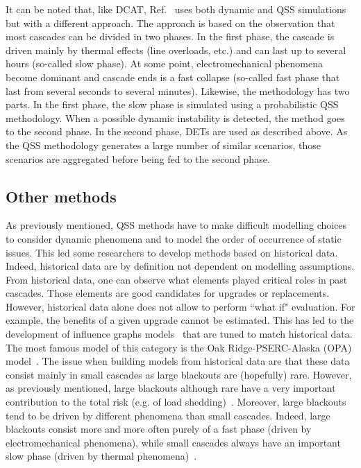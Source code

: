It can be noted that, like DCAT, Ref.~\cite{PierreIEEEtran} uses both dynamic and QSS simulations but with a different approach. The approach is based on the observation that most cascades can be divided in two phases. In the first phase, the cascade is driven mainly by thermal effects (line overloads, etc.) and can last up to several hours (so-called slow phase). At some point, electromechanical phenomena become dominant and cascade ends is a fast collapse (so-called fast phase that last from several seconds to several minutes). Likewise, the methodology has two parts. In the first phase, the slow phase is simulated using a probabilistic QSS methodology. When a possible dynamic instability is detected, the method goes to the second phase. In the second phase, DETs are used as described above. As the QSS methodology generates a large number of similar scenarios, those scenarios are aggregated before being fed to the second phase.



\subsection{Other methods}
\label{sec:OtherMethods}

As previously mentioned, QSS methods have to make difficult modelling choices to consider dynamic phenomena and to model the order of occurrence of static issues. This led some researchers to develop methods based on historical data. Indeed, historical data are by definition not dependent on modelling assumptions. From historical data, one can observe what elements played critical roles in past cascades. Those elements are good candidates for upgrades or replacements. However, historical data alone does not allow to perform ``what if" evaluation. For example, the benefits of a given upgrade cannot be estimated. This has led to the development of influence graphs models~\cite{CascadingInfluenceGraph} that are tuned to match historical data. The most famous model of this category is the Oak Ridge-PSERC-Alaska (OPA) model~\cite{OPA2019}. The issue when building models from historical data are that these data consist mainly in small cascades as large blackouts are (hopefully) rare. However, as previously mentioned, large blackouts although rare have a very important contribution to the total risk (e.g. of load shedding)~\cite{CascadingMethodoAndChallenges}. Moreover, large blackouts tend to be driven by different phenomena than small cascades. Indeed, large blackouts consist more and more often purely of a fast phase (driven by electromechanical phenomena), while small cascades always have an important slow phase (driven by thermal phenomena)~\cite{cascadeAcceleration}.

